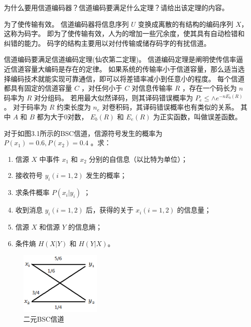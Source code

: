 \documentclass[onecolumn,oneside]{BUPTHomework}
\begin{document}
  \begin{problem}[12]
  {
    为什么要用信道编码器？信道编码要满足什么定理？请给出该定理的内容。
  }
  \end{problem}

  \begin{solution}
  {
    为了使传输有效。
    信道编码器将信息序列 $U$ 变换成离散的有结构的编码序列 $X$，这称为码字。
    即为了使传输有效，人为的增加一些冗余度，使其具有自动检错和纠错的能力。
    码字的结构主要用以对付传输或储存码字的有扰信道。

    信道编码要满足信道编码定理(仙农第二定理)。
    信道编码定理是阐明使传信率逼近信道容量大编码是存在的定律。
    如果系统的传输率小于信道容量，那么适当选择编码技术就能实现可靠通信，即可以将差错率减小到任意小的程度。
    每个信道都具有固定的信道容量 $C$ ，对任何小于 $C$ 对信息传输率 $R$ ，存在一个码长为 $n$ 码率为 $R$ 对分组码。
    若用最大似然译码，则其译码错误概率为  $P_e \leq \land e^{-nE_b(R)}$  。
    对于码率为 $R$ 约束长度为 $n_e$ 对卷积码，其译码错误概率也有类似的关系。
    其中 $A$ 和 $B$ 都为大于0对数， $E_b(R)$ 和  $E_e(R)$ 为正实函数，叫做误差函数。 
  }
  \end{solution}


  \begin{problem}[18]
  {
    对于如图3.1所示的BSC信道，信源符号发生的概率为 $P(x_1)=0.6,P(x_2)=0.4$ 。求：
    \begin{enumerate}
      \item 信源 $X$ 中事件 $x_1$ 和 $x_2$ 分别的自信息（以比特为单位）；
      \item 接收符号 $y_i(i=1,2)$ 发生的概率；
      \item 求条件概率 $P(x_i \vert y_i)$ ；
      \item 收到消息 $y_i(i=1,2)$ 后，获得的关于 $x_i(i=1,2)$ 的信息量；
      \item 信源 $X$ 和信源 $Y$ 的信息熵；
      \item 条件熵 $H(X \vert Y)$ 和 $H(Y \vert X)$。
    \end{enumerate}

    \begin{figure}[!htbp]
      \centering
      \includegraphics[width = 4cm ]{image/picture1.png}
      \caption{二元BSC信道}
    \end{figure}
  }
  \end{problem}
\end{document}
